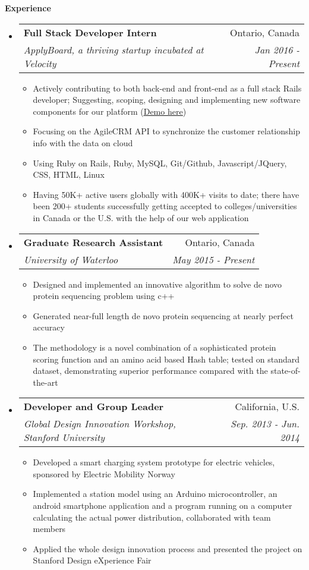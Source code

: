 \documentclass[letterpaper,10pt]{article}
\makeatletter
\newcommand{\resitem}[1]{\item #1 \vspace{-2pt}}
\newcommand{\resheading}[1]{{\large \colorbox{mygrey}{\begin{minipage}{\textwidth}{\textbf{#1 \vphantom{p\^{E}}}}\end{minipage}}}}
\newcommand{\ressubheading}[4]{
\begin{tabular*}{7.0in}{l@{\extracolsep{\fill}}r}
		\textbf{#1} & #2 \\
		\textit{#3} & \textit{#4} \\
\end{tabular*}\vspace{-6pt}}
\makeatother
\begin{document}
\resheading{Experience}
\begin{itemize}
\itemsep0em
\item 
    \ressubheading{Full Stack Developer Intern}{Ontario, Canada}{ApplyBoard, a thriving startup incubated at Velocity}{Jan 2016 - Present}
	\begin{itemize}
            \resitem{Actively contributing to both back-end and front-end as a full stack Rails developer; Suggesting, scoping, designing and implementing new software components for our platform (\href{https://www.applyboard.com/demo}{\underline{Demo here}})}
		\resitem{Focusing on the AgileCRM API to synchronize the customer relationship info with the data on cloud}
		\resitem{Using Ruby on Rails, Ruby, MySQL, Git/Github, Javascript/JQuery, CSS, HTML, Linux}
        \resitem{Having 50K+ active users globally with 400K+ visits to date; there have been 200+ students successfully getting accepted to colleges/universities in Canada or the U.S. with the help of our web application }
	\end{itemize}

\item
	\ressubheading{Graduate Research Assistant}{Ontario, Canada}{University of Waterloo}{May 2015 - Present}
	\begin{itemize}
		\resitem{Designed and implemented an innovative algorithm to solve de novo protein sequencing problem using c++}
		\resitem{Generated near-full length de novo protein sequencing at nearly perfect accuracy}
		\resitem{The methodology is a novel combination of a sophisticated protein scoring function and an amino acid based Hash table; tested on standard dataset, demonstrating superior performance compared with the state-of-the-art}
	\end{itemize}
\item
	\ressubheading{Developer and Group Leader}{California, U.S.}{Global Design Innovation Workshop, Stanford University}{ Sep. 2013 - Jun. 2014}
	\begin{itemize}
		\resitem{Developed a smart charging system prototype for electric vehicles, sponsored by Electric Mobility Norway}
		\resitem {Implemented a station model using an Arduino microcontroller, an android smartphone application and a program running on a computer calculating the actual power distribution, collaborated with team members}
		\resitem{Applied the whole design innovation process and presented the project on Stanford Design eXperience Fair}
	\end{itemize}
\end{itemize}
\end{document}

